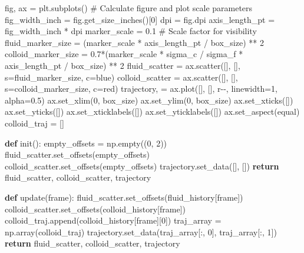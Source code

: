 \documentclass[
  letterpaper,
  enabledeprecatedfontcommands]{report}
\newenvironment{Shaded}{\begin{snugshade}}{\end{snugshade}}
\newcommand{\CommentTok}[1]{\textcolor[rgb]{0.37,0.37,0.37}{#1}}
\newcommand{\ControlFlowTok}[1]{\textcolor[rgb]{0.00,0.23,0.31}{\textbf{#1}}}
\newcommand{\DecValTok}[1]{\textcolor[rgb]{0.68,0.00,0.00}{#1}}
\newcommand{\FloatTok}[1]{\textcolor[rgb]{0.68,0.00,0.00}{#1}}
\newcommand{\KeywordTok}[1]{\textcolor[rgb]{0.00,0.23,0.31}{\textbf{#1}}}
\newcommand{\NormalTok}[1]{\textcolor[rgb]{0.00,0.23,0.31}{#1}}
\newcommand{\OperatorTok}[1]{\textcolor[rgb]{0.37,0.37,0.37}{#1}}
\newcommand{\StringTok}[1]{\textcolor[rgb]{0.13,0.47,0.30}{#1}}
\begin{document}
\begin{Shaded}
\begin{Highlighting}[]
\NormalTok{fig, ax }\OperatorTok{=}\NormalTok{ plt.subplots()}
\CommentTok{\# Calculate figure and plot scale parameters}
\NormalTok{fig\_width\_inch }\OperatorTok{=}\NormalTok{ fig.get\_size\_inches()[}\DecValTok{0}\NormalTok{]}
\NormalTok{dpi }\OperatorTok{=}\NormalTok{ fig.dpi}
\NormalTok{axis\_length\_pt }\OperatorTok{=}\NormalTok{ fig\_width\_inch }\OperatorTok{*}\NormalTok{ dpi}
\NormalTok{marker\_scale }\OperatorTok{=} \FloatTok{0.1}  \CommentTok{\# Scale factor for visibility}
\NormalTok{fluid\_marker\_size }\OperatorTok{=}\NormalTok{ (marker\_scale }\OperatorTok{*}\NormalTok{ axis\_length\_pt }\OperatorTok{/}\NormalTok{ box\_size) }\OperatorTok{**} \DecValTok{2}
\NormalTok{colloid\_marker\_size }\OperatorTok{=} \FloatTok{0.7}\OperatorTok{*}\NormalTok{(marker\_scale }\OperatorTok{*}\NormalTok{ sigma\_c }\OperatorTok{/}\NormalTok{ sigma\_f }\OperatorTok{*}\NormalTok{ axis\_length\_pt }\OperatorTok{/}\NormalTok{ box\_size) }\OperatorTok{**} \DecValTok{2}
\NormalTok{fluid\_scatter }\OperatorTok{=}\NormalTok{ ax.scatter([], [], s}\OperatorTok{=}\NormalTok{fluid\_marker\_size, c}\OperatorTok{=}\StringTok{\textquotesingle{}blue\textquotesingle{}}\NormalTok{)}
\NormalTok{colloid\_scatter }\OperatorTok{=}\NormalTok{ ax.scatter([], [], s}\OperatorTok{=}\NormalTok{colloid\_marker\_size, c}\OperatorTok{=}\StringTok{\textquotesingle{}red\textquotesingle{}}\NormalTok{)}
\NormalTok{trajectory, }\OperatorTok{=}\NormalTok{ ax.plot([], [], }\StringTok{\textquotesingle{}r{-}{-}\textquotesingle{}}\NormalTok{, linewidth}\OperatorTok{=}\DecValTok{1}\NormalTok{, alpha}\OperatorTok{=}\FloatTok{0.5}\NormalTok{)}
\NormalTok{ax.set\_xlim(}\DecValTok{0}\NormalTok{, box\_size)}
\NormalTok{ax.set\_ylim(}\DecValTok{0}\NormalTok{, box\_size)}
\NormalTok{ax.set\_xticks([])}
\NormalTok{ax.set\_yticks([])}
\NormalTok{ax.set\_xticklabels([])}
\NormalTok{ax.set\_yticklabels([])}
\NormalTok{ax.set\_aspect(}\StringTok{\textquotesingle{}equal\textquotesingle{}}\NormalTok{)}
\NormalTok{colloid\_traj }\OperatorTok{=}\NormalTok{ []}

\KeywordTok{def}\NormalTok{ init():}
\NormalTok{    empty\_offsets }\OperatorTok{=}\NormalTok{ np.empty((}\DecValTok{0}\NormalTok{, }\DecValTok{2}\NormalTok{))}
\NormalTok{    fluid\_scatter.set\_offsets(empty\_offsets)}
\NormalTok{    colloid\_scatter.set\_offsets(empty\_offsets)}
\NormalTok{    trajectory.set\_data([], [])}
    \ControlFlowTok{return}\NormalTok{ fluid\_scatter, colloid\_scatter, trajectory}

\KeywordTok{def}\NormalTok{ update(frame):}
\NormalTok{    fluid\_scatter.set\_offsets(fluid\_history[frame])}
\NormalTok{    colloid\_scatter.set\_offsets(colloid\_history[frame])}
\NormalTok{    colloid\_traj.append(colloid\_history[frame][}\DecValTok{0}\NormalTok{])}
\NormalTok{    traj\_array }\OperatorTok{=}\NormalTok{ np.array(colloid\_traj)}
\NormalTok{    trajectory.set\_data(traj\_array[:, }\DecValTok{0}\NormalTok{], traj\_array[:, }\DecValTok{1}\NormalTok{])}
    \ControlFlowTok{return}\NormalTok{ fluid\_scatter, colloid\_scatter, trajectory}


\end{Highlighting}
\end{Shaded}
\end{document}
